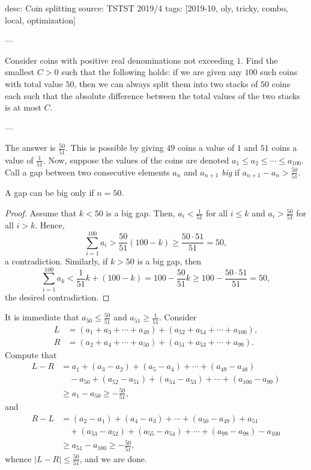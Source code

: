 desc: Coin splitting
source: TSTST 2019/4
tags: [2019-10, oly, tricky, combo, local, optimization]

---

Consider coins with positive real denominations not exceeding $1$. Find the smallest $C>0$ such that the following holds: if we are given any $100$ such coins with total value $50$, then we can always split them into two stacks of $50$ coins each such that the absolute difference between the total values of the two stacks is at most $C$.

---

The answer is $\tfrac{50}{51}$. This is possible by giving $49$ coins a value of $1$ and $51$ coins a value of $\tfrac1{51}$. Now, suppose the values of the coins are denoted $a_1\le a_2\le\cdots\le a_{100}$. Call a gap between two consecutive elements $a_n$ and $a_{n+1}$ \emph{big} if $a_{n+1}-a_n>\tfrac{50}{51}$.
\begin{claim*}
    A gap can be big only if $n=50$.
\end{claim*}
\begin{proof}
    Assume that $k<50$ is a big gap. Then, $a_i<\tfrac1{51}$ for all $i\le k$ and $a_i>\tfrac{50}{51}$ for all $i>k$. Hence, \[\sum_{i=1}^{100}a_i>\frac{50}{51}(100-k)\ge\frac{50\cdot51}{51}=50,\]
    a contradiction. Similarly, if $k>50$ is a big gap, then \[\sum_{i=1}^{100}a_k<\frac1{51}k+(100-k)=100-\frac{50}{51}k\ge100-\frac{50\cdot 51}{51}=50,\]
    the desired contradiction.
\end{proof}

It is immediate that $a_{50}\le\tfrac{50}{51}$ and $a_{51}\ge\tfrac1{51}$. Consider
\begin{align*}
    L&=(a_1+a_3+\cdots+a_{49})+(a_{52}+a_{54}+\cdots+a_{100}),\\
    R&=(a_2+a_4+\cdots+a_{50})+(a_{51}+a_{53}+\cdots+a_{99}).
\end{align*}
Compute that
\begin{align*}
    L-R&=a_1+(a_3-a_2)+(a_5-a_4)+\cdots+(a_{49}-a_{48})\\
    &\quad-a_{50}+(a_{52}-a_{51})+(a_{54}-a_{53})+\cdots+(a_{100}-a_{99})\\
    &\ge a_1-a_{50}\ge-\frac{50}{51},
\end{align*}
and
\begin{align*}
    R-L&=(a_2-a_1)+(a_4-a_3)+\cdots+(a_{50}-a_{49})+a_{51}\\
    &\quad+(a_{53}-a_{52})+(a_{55}-a_{54})+\cdots+(a_{99}-a_{98})-a_{100}\\
    &\ge a_{51}-a_{100}\ge-\frac{50}{51},
\end{align*}
whence $|L-R|\le\tfrac{50}{51}$, and we are done.
